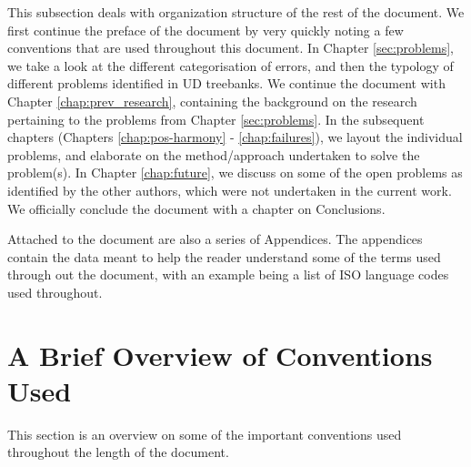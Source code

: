 This subsection deals with organization structure of the rest of the document. We first continue the preface of the document by very quickly noting a few conventions that are used throughout this document. In Chapter \ref{sec:problems}, we take a look at the different categorisation of errors, and then the typology of different problems identified in UD treebanks. We continue the document with Chapter \ref{chap:prev_research}, containing the background on the research pertaining to the problems from Chapter \ref{sec:problems}. In the subsequent chapters (Chapters \ref{chap:pos-harmony} - \ref{chap:failures}), we layout the individual problems, and elaborate on the method/approach undertaken to solve the problem(s). In Chapter \ref{chap:future}, we discuss on some of the open problems as identified by the other authors, which were not undertaken in the current work. We officially conclude the document with a chapter on Conclusions.

Attached to the document are also a series of Appendices. The appendices contain the data meant to help the reader understand some of the terms used through out the document, with an example being a list of ISO language codes used throughout.

\section{A Brief Overview of Conventions Used}
\label{conventions}

This section is an overview on some of the important conventions used throughout the length of the document.

